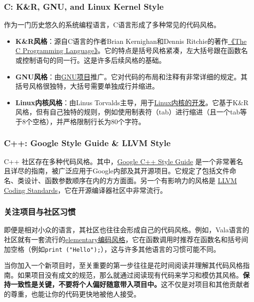 \documentclass[../main.tex]{subfiles}
\begin{document}
\subsubsection{C: K\&R, GNU, and Linux Kernel Style}
作为一门历史悠久的系统编程语言，C语言形成了多种常见的代码风格。
\begin{itemize}
  \item \textbf{K\&R风格}：源自C语言的作者Brian Kernighan和Dennis Ritchie的著作\href{https://en.wikipedia.org/wiki/The_C_Programming_Language}{《The C Programming Language》}。它的特点是括号风格紧凑，左大括号跟在函数名或控制语句的同一行。这是许多后续风格的基础。
  \item \textbf{GNU风格}：由\href{https://www.gnu.org/prep/standards/standards.html}{GNU项目}推广。它对代码的布局和注释有非常详细的规定。其括号风格很独特，大括号需要单独成行并缩进。
  \item \textbf{Linux内核风格}：由Linus Torvalds主导，用于\href{https://www.kernel.org/doc/html/latest/process/coding-style.html}{Linux内核的开发}。它基于K\&R风格，但有自己独特的规则，例如使用制表符（tab）进行缩进（且一个tab等于8个空格），并严格限制行长为80个字符。
\end{itemize}

\subsubsection{C++: Google Style Guide \& LLVM Style}
C++ 社区存在多种代码风格。其中，\href{https://google.github.io/styleguide/cppguide.html}{Google C++ Style Guide} 是一个非常著名且详尽的指南，被广泛应用于Google内部及其开源项目。它规定了包括文件命名、类设计、函数参数顺序在内的方方面面。另一个有影响力的风格是 \href{https://llvm.org/docs/CodingStandards.html}{LLVM Coding Standards}，它在开源编译器社区中非常流行。

\subsubsection{关注项目与社区习惯}
即便是相对小众的语言，其社区也往往会形成自己的代码风格。例如，Vala语言的社区就有一套流行的\href{https://docs.elementary.io/develop/writing-apps/code-style}{elementary编码风格}，它在函数调用时推荐在函数名和括号间加空格（例如\texttt{print ("Hello");}），这与许多其他语言的习惯可能不同。

当你加入一个新项目时，至关重要的第一步往往是花时间阅读并理解其代码风格指南。如果项目没有成文的规范，那么就通过阅读现有代码来学习和模仿其风格。\textbf{保持一致性是关键，不要将个人偏好随意带入项目中。}这不仅是对项目和其他贡献者的尊重，也能让你的代码更快地被他人接受。
\end{document}
